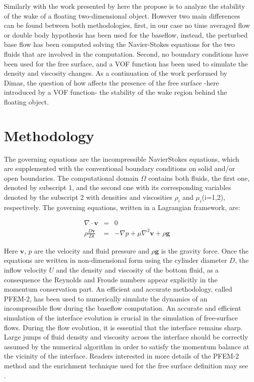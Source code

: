 \documentclass[%
 reprint,
 amsmath,amssymb,
 aps,
prl
]{revtex4-1}
\begin{document}
Similarly with the work presented by \cite{Dimas89} here the propose is to analyze the stability of the wake of a floating two-dimensional object. However two main differences can be found between both methodologies, first, in our case no time averaged flow or double body hypothesis has been used for the baseflow, instead, the perturbed base flow has been computed solving the Navier-Stokes equations for the two fluids that are involved in the computation. Second, no boundary conditions have been used for the free surface, and a VOF function \cite{Hirsch07} has been used to simulate the density and viscosity changes. As a continuation of the work performed by Dimas, the question of how affects the presence of the free surface -here introduced by a VOF function- the stability of the wake region behind the floating object.

\section{Methodology}
\label{S:Methodology}


The governing equations are the incompressible NavierStokes equations, which are supplemented with the conventional boundary conditions on solid and/or open boundaries. The computational domain $\Omega$ contains both fluids, the first one, denoted by subscript 1, and the second one with its corresponding variables denoted by the subscript 2 with densities and viscosities $\rho_i$ and $\mu_i$(i=1,2), respectively. The governing equations, written in a Lagrangian framework, are:

\begin{eqnarray}
  \nabla \cdot \mathbf{v} &=& 0 \label{eq:continuity} \\
  \rho\frac{D\mathbf{v}}{Dt} &=& -\nabla p + \mu \nabla^2 \mathbf{v} + \rho \mathbf{g}  \label{eq:momentum}
\end{eqnarray}

Here $\mathbf{v}$, $p$ are the velocity and fluid pressure and $\rho \mathbf{g}$ is the gravity force. Once the equations are written in non-dimensional form using the cylinder diameter $D$, the inflow velocity $U$ and the density and viscosity of the bottom fluid, as a consequence the Reynolds and Froude numbers appear explicitly in the momentum conservation part. An efficient and accurate methodology, called PFEM-2, has been used to numerically simulate the dynamics of an incompressible flow during the baseflow computation. An accurate and efficient simulation of the interface evolution is crucial in the simulation of free-surface flows. During the flow evolution, it is essential that the interface remains sharp. Large jumps of fluid density and viscosity across the interface should be correctly assumed by the numerical algorithm in order to satisfy the momentum balance at the vicinity of the interface. Readers interested in more details of the PFEM-2 method and the enrichment technique used for the free surface definition may see \cite{Gimenez2015186}.
\end{document}
